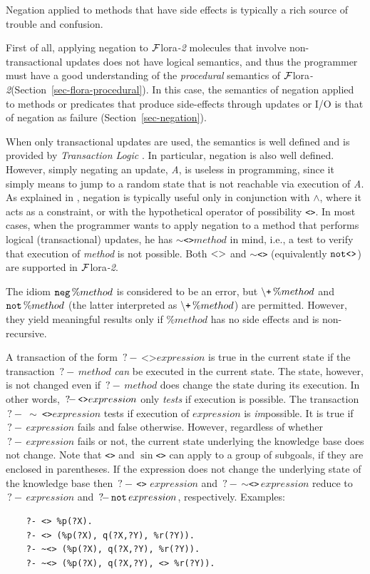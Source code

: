 \documentclass[11pt]{article}
\newcommand{\query}{\mbox{$\, ?\! - \, $}}                  %
\newcommand{\FLORA}{{\mbox{\sc ${\cal F}${lora}\rm\emph{-2}}}\xspace}
\newcommand{\NAF}{\mbox{\tt \ensuremath{\tt\backslash}+}\xspace}
\newcommand{\TNOT}{{{\tt not}}\xspace}
\begin{document}
Negation applied to methods that have side effects is typically a rich source
of trouble and confusion.

First of all, applying negation to \FLORA molecules that involve
non-transactional updates does not have logical semantics, and thus the
programmer must have a good understanding of the \emph{procedural} semantics of
\FLORA (Section~\ref{sec-flora-procedural}).
In this case, the semantics of negation applied to methods or predicates that produce
side-effects through updates  or I/O is that of negation as failure
(Section~\ref{sec-negation}).

When only transactional updates are used, the semantics is well defined and
is provided by \emph{Transaction Logic}
\cite{trans-chapter-98,trans-tcs94}. In particular, negation is also well
defined. However, simply negating an update, \emph{A}, is useless in
programming, since it simply means to jump to a random state that is not
reachable via execution of \emph{A}.  As explained in
\cite{trans-chapter-98,trans-tcs94}, negation is typically useful only in conjunction
with $\wedge$, where it acts as a constraint, or with the hypothetical
operator of possibility \texttt{<>}.  In most cases, when the programmer
wants to apply negation to a method that performs logical (transactional)
updates, he has \texttt{$\sim$<>}$method$  in mind, i.e., a test to
verify that execution of \emph{method}  is not possible.
Both $\tt<>$ and \texttt{$\sim$<>} (equivalently $\tt\TNOT \texttt{<>}$) are supported in \FLORA.

The idiom ${\tt neg}\,\%method$ is considered to be an error, but
$\NAF\,\%method$ and $\TNOT\,\%method$ (the latter interpreted as
$\NAF\,\%method$) are permitted. However, they yield meaningful results only
if $\%method$ has no side effects and is non-recursive.

A transaction of the form $\query \texttt{<>} expression$ is true in the current
state if the transaction $\query method$ \emph{can} be executed in the current
state. The state, however, is not changed even if  $\query method$
does change the state during its execution. In other words, $\texttt{\query <>}
expression$ only \emph{tests} if execution is possible.
The transaction \texttt{\query} \texttt{$\sim$ <>}$expression$ tests if execution of
$expression$ is \emph{im}possible. It is true if $\query expression$ fails
and false otherwise. However, regardless of whether $\query expression$
fails or not, the current state underlying the knowledge base does not
change.
Note that \texttt{<>} and \texttt{$\sin$<>} can apply to a group of
subgoals, if they are enclosed in parentheses.  If the expression does not
change the underlying state of the knowledge base then
\texttt{\query <>} $expression$ and \query\texttt{$\sim$<>}\,$expression$ reduce to
$\query expression$ and $\query \TNOT\,expression$, respectively.
Examples:
\begin{verbatim}
    ?- <> %p(?X).
    ?- <> (%p(?X), q(?X,?Y), %r(?Y)).
    ?- ~<> (%p(?X), q(?X,?Y), %r(?Y)).
    ?- ~<> (%p(?X), q(?X,?Y), <> %r(?Y)).
\end{verbatim}
\end{document}

